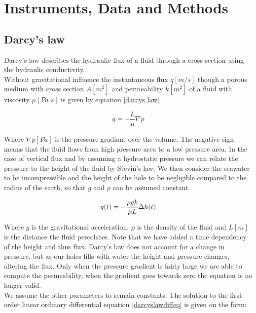 \section{Instruments, Data and Methods} \label{sec:methods}

\subsection{Darcy's law}

Darcy's law describes the hydraulic flux of a fluid through a cross section using the hydraulic conductivity.\\
Without gravitational influence the instantaneous flux $q[m/s]$ though a porous medium with cross section $A[m^2]$ and permeability $k[m^2]$ of a fluid with viscosity $\mu[Pa \; s]$ is given by equation \ref{darcys law}

\begin{equation}\label{darcys law}
    q = -\frac{k}{\mu}\nabla p
\end{equation}

Where $\nabla p[Pa]$ is the pressure gradiant over the volume.
The negative sign means that the fluid flows from high pressure area to a low pressure area.
In the case of vertical flux and by assuming a hydrostatic pressure we can relate the pressure to the height of the fluid by Stevin's law.
We then consider the seawater to be incompressible and the height of the hole to be negligible compared to the radius of the earth, so that $g$ and $\rho$ can be assumed constant.

\begin{equation}\label{darcyslawdiffeq}
    q(t) = -\frac{\rho g k}{\mu L}\Delta h(t) \\
\end{equation}

Where $g$ is the gravitational acceleration, $\rho$ is the density of the fluid and $L[m]$ is the distance the fluid percolates.
Note that we have added a time dependency of the height and thus flux.
Darcy's law does not account for a change in pressure, but as our holes fills with water the height and pressure changes, altering the flux.
Only when the pressure gradient is fairly large we are able to compute the permeability, when the gradient goes towards zero the equation is no longer valid.  \\
We assume the other parameters to remain constants.
The solution to the first-order linear ordinary differential equation \ref{darcyslawdiffeq} is given on the form:

